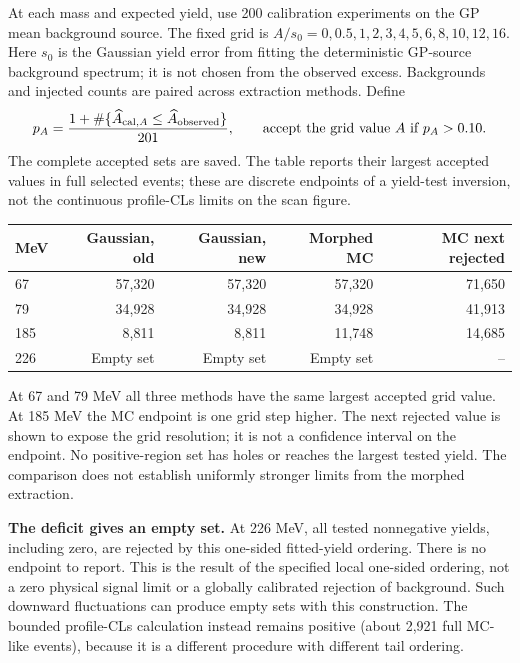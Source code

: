 \documentclass[11pt]{article}
\begin{document}
At each mass and expected yield, use 200 calibration experiments on the GP mean background source. The fixed grid is $A/s_0=0,0.5,1,2,3,4,5,6,8,10,12,16$. Here $s_0$ is the Gaussian yield error from fitting the deterministic GP-source background spectrum; it is not chosen from the observed excess. Backgrounds and injected counts are paired across extraction methods. Define
\[
 p_A=\frac{1+\#\{\widehat A_{{\rm cal},A}\le\widehat A_{\rm observed}\}}{201},
 \qquad \hbox{accept the grid value }A\hbox{ if }p_A>0.10.
\]
The complete accepted sets are saved. The table reports their largest accepted values in full selected events; these are discrete endpoints of a yield-test inversion, not the continuous profile-CLs limits on the scan figure.
\begin{center}\small\begin{tabular}{lrrrr}\toprule
MeV & Gaussian, old & Gaussian, new & Morphed MC & MC next rejected\\\midrule
67 & 57,320 & 57,320 & 57,320 & 71,650\\
79 & 34,928 & 34,928 & 34,928 & 41,913\\
185 & 8,811 & 8,811 & 11,748 & 14,685\\
226 & Empty set & Empty set & Empty set & --\\
\bottomrule\end{tabular}\end{center}
At 67 and 79 MeV all three methods have the same largest accepted grid value. At 185 MeV the MC endpoint is one grid step higher. The next rejected value is shown to expose the grid resolution; it is not a confidence interval on the endpoint. No positive-region set has holes or reaches the largest tested yield. The comparison does not establish uniformly stronger limits from the morphed extraction.

\textbf{The deficit gives an empty set.} At 226 MeV, all tested nonnegative yields, including zero, are rejected by this one-sided fitted-yield ordering. There is no endpoint to report. This is the result of the specified local one-sided ordering, not a zero physical signal limit or a globally calibrated rejection of background. Such downward fluctuations can produce empty sets with this construction. The bounded profile-CLs calculation instead remains positive (about 2,921 full MC-like events), because it is a different procedure with different tail ordering.
\end{document}
